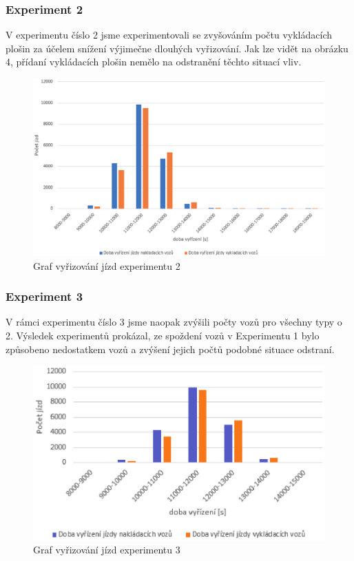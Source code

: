 \documentclass[a4paper, 11pt]{article}
\begin{document}
\newpage
\subsubsection{Experiment 2}
\noindent V experimentu číslo 2 jsme experimentovali se zvyšováním počtu vykládacích plošin za účelem snížení výjimečne dlouhých vyřizování. Jak lze vidět na obrázku 4, přídaní vykládacích plošin nemělo na odstranění těchto situací vliv.

\begin{figure}[h!]
\begin{center}
\includegraphics[scale=0.5]{exp2.eps}
\caption{Graf vyřizování jízd experimentu 2}
\end{center}
\end{figure} 

\subsubsection{Experiment 3}
\noindent V rámci experimentu číslo 3 jsme naopak zvýšili počty vozů pro všechny typy o 2. Výsledek experimentů prokázal, ze spoždení vozů v Experimentu 1 bylo způsobeno nedostatkem vozů a zvýšení jejich počtů podobné situace odstraní.\\

\begin{figure}[h!]
\begin{center}
\includegraphics[scale=0.75]{exp3.eps}
\caption{Graf vyřizování jízd experimentu 3}
\end{center}
\end{figure}
\vspace{1pt}
\end{document}
